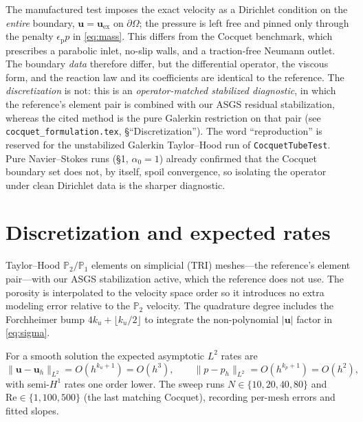 \documentclass[11pt]{article}
\newcommand{\uu}{\bm{u}}
\begin{document}
The manufactured test imposes the exact velocity as a Dirichlet condition on
the \emph{entire} boundary, $\uu=\uu_{\mathrm{ex}}$ on $\partial\Omega$; the
pressure is left free and pinned only through the penalty
$\epsilon_{\mathrm p}p$ in \eqref{eq:mass}. This differs from the Cocquet
benchmark, which prescribes a parabolic inlet, no-slip walls, and a
traction-free Neumann outlet. The boundary \emph{data} therefore differ, but
the differential operator, the viscous form, and the reaction law and its
coefficients are identical to the reference. The \emph{discretization} is not:
this is an \emph{operator-matched stabilized diagnostic}, in which the
reference's element pair is combined with our ASGS residual stabilization,
whereas the cited method is the pure Galerkin restriction on that pair (see
\texttt{cocquet\_formulation.tex}, \S``Discretization''). The word
``reproduction'' is reserved for the unstabilized Galerkin Taylor--Hood run of
\texttt{CocquetTubeTest}. Pure Navier--Stokes
runs (\S1, $\alpha_0=1$) already confirmed that the Cocquet boundary set does
not, by itself, spoil convergence, so isolating the operator under clean
Dirichlet data is the sharper diagnostic.

\section{Discretization and expected rates}

Taylor--Hood $\mathbb{P}_2/\mathbb{P}_1$ elements on simplicial (TRI)
meshes---the reference's element pair---with our ASGS stabilization active,
which the reference does not use. The porosity is interpolated to the
velocity space order so it introduces no extra modeling error relative to the
$\mathbb{P}_2$ velocity. The quadrature degree includes the Forchheimer bump
$4k_u+\lfloor k_u/2\rfloor$ to integrate the non-polynomial
$\lvert\uu\rvert$ factor in \eqref{eq:sigma}.

For a smooth solution the expected asymptotic $L^2$ rates are
\begin{equation}
\lVert\uu-\uu_h\rVert_{L^2}=O(h^{k_u+1})=O(h^3),
\qquad
\lVert p-p_h\rVert_{L^2}=O(h^{k_p+1})=O(h^2),
\end{equation}
with semi-$H^1$ rates one order lower. The sweep runs
$N\in\{10,20,40,80\}$ and $\mathrm{Re}\in\{1,100,500\}$ (the last matching
Cocquet), recording per-mesh errors and fitted slopes.
\end{document}
